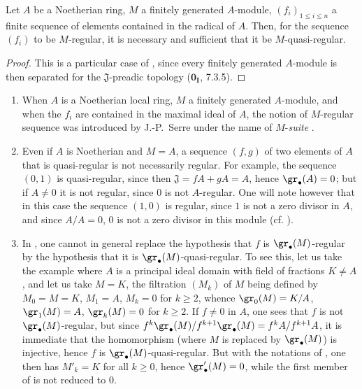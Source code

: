 \begin{corollary}[15.1.11]
\label{0.15.1.11}
Let $A$ be a Noetherian ring, $M$ a finitely generated $A$-module, $(f_i)_{1\leq i\leq n}$ a finite sequence of elements contained in the radical of $A$.
Then, for the sequence $(f_i)$ to be $M$-regular, it is necessary and sufficient that it be $M$-quasi-regular.
\end{corollary}

\begin{proof}
This is a particular case of , since every finitely generated $A$-module is then separated for the $\mathfrak{J}$-preadic topology ($\mathbf{0_I}$, 7.3.5).
\end{proof}

\begin{remarks}[15.1.12]
\label{0.15.1.12}
\mbox{}
\begin{enumerate}
  \item[(i)] When $A$ is a Noetherian local ring, $M$ a finitely generated $A$-module, and when the $f_i$ are contained in the maximal ideal of $A$, the notion of $M$-regular sequence was introduced by J.-P.~Serre under the name of $M$-\emph{suite} \cite{I-17}.
  \item[(ii)] Even if $A$ is Noetherian and $M=A$, a sequence $(f,g)$ of two elements of $A$ that is quasi-regular is not necessarily regular.
  For example, the sequence $(0,1)$ is quasi-regular, since then $\mathfrak{J}=fA+gA=A$, hence $\gr_\bullet(A)=0$;
  but if $A\neq 0$ it is not regular, since $0$ is not $A$-regular.
  One will note however that in this case the sequence $(1,0)$ is regular, since $1$ is not a zero divisor in $A$, and since $A/A=0$, $0$ is not a zero divisor in this module (cf. ).
  \item[(iii)]
  In , one cannot in general replace the hypothesis that $f$ is $\gr_\bullet(M)$-regular by the hypothesis that it is $\gr_\bullet(M)$-quasi-regular.
  To see this, let us take the example  where $A$ is a principal ideal domain with field of fractions $K\neq A$, and let us take $M=K$, the filtration $(M_k)$ of $M$ being defined by $M_0=M=K$, $M_1=A$, $M_k=0$ for $k\geq 2$, whence $\gr_0(M)=K/A$, $\gr_1(M)=A$, $\gr_k(M)=0$ for $k\geq 2$.
  If $f\neq 0$ in $A$, one sees that $f$ is not $\gr_\bullet(M)$-regular, but since $f^k\gr_\bullet(M)/f^{k+1}\gr_\bullet(M)=f^kA/f^{k+1}A$, it is immediate that the homomorphism  (where $M$ is replaced by $\gr_\bullet(M)$) is injective, hence $f$ is $\gr_\bullet(M)$-quasi-regular.
  But with the notations of , one then has $M'_k=K$ for all $k\geq 0$, hence $\gr'_\bullet(M)=0$, while the first member of  is not reduced to $0$.
\end{enumerate}
\end{remarks}


